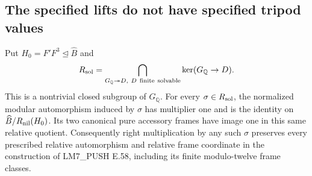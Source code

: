 \subsection{The specified lifts do not have specified tripod values}

Put $H_0=F'F^3\trianglelefteq\widehat B$ and
\[
 R_{\rm sol}=\bigcap_{G_{\mathbb Q}\twoheadrightarrow D,
                         \ D\ \mathrm{finite\ solvable}}\ker(G_{\mathbb Q}\to D).
\]
This is a nontrivial closed subgroup of $G_{\mathbb Q}$.
For every $\sigma\in R_{\rm sol}$, the normalized modular
automorphism induced by $\sigma$ has multiplier one and is
the identity on $\widehat B/R_{\rm nil}(H_0)$.  Its two
canonical pure accessory frames have image one in this
same relative quotient.  Consequently right multiplication
by any such $\sigma$ preserves every prescribed relative
automorphism and relative frame coordinate in the
construction of LM7\_PUSH E.58, including its finite
modulo-twelve frame classes.

